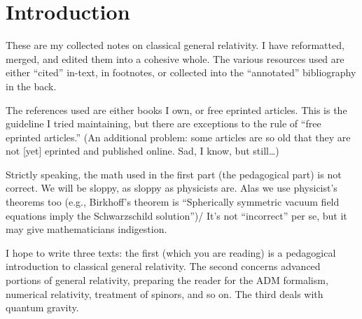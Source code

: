 \renewcommand{\leftmark}{Introduction}
\section*{Introduction}
These are my collected notes on classical general relativity. I
have reformatted, merged, and edited them into a cohesive whole.
The various resources used are either ``cited'' in-text, in
footnotes, or collected into the ``annotated'' bibliography in
the back. 

The references used are either books I own, or free eprinted
articles. This is the guideline I tried maintaining, but there
are exceptions to the rule of ``free eprinted articles.'' (An
additional problem: some articles are so old that they are not
[yet] eprinted and published online. Sad, I know, but still\dots)

Strictly speaking, the math used in the first part (the
pedagogical part) is not correct. We will be sloppy, as sloppy as
physicists are. Alas we use physicist's theorems too (e.g.,
Birkhoff's theorem is ``Spherically symmetric vacuum field
equations imply the Schwarzschild solution'')/ It's not
``incorrect'' per se, but it may give mathematicians indigestion.

I hope to write three texts: the first (which you are reading) is
a pedagogical introduction to classical general relativity. The
second concerns advanced portions of general relativity,
preparing the reader for the ADM formalism, numerical relativity,
treatment of spinors, and so on. The third deals with quantum gravity.
